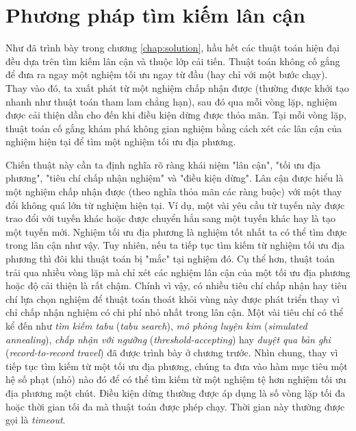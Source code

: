 \chapter{Phương pháp tìm kiếm lân cận}
\label{chap:search}

Như đã trình bày trong chương \ref{chap:solution}, hầu hết các thuật toán hiện đại đều dựa trên tìm kiếm lân cận và thuộc lớp cải tiến. Thuật toán không cố gắng để đưa ra ngay một nghiệm tối ưu ngay từ đầu (hay chỉ với một bước chạy). Thay vào đó, ta xuất phát từ một nghiệm chấp nhận được (thường được khởi tạo nhanh như thuật toán tham lam chẳng hạn), sau đó qua mỗi vòng lặp, nghiệm được cải thiện dần cho đến khi điều kiện dừng được thỏa mãn. Tại mỗi vòng lặp, thuật toán cố gắng khám phá không gian nghiệm bằng cách xét các lân cận của nghiệm hiện tại để tìm một nghiệm tối ưu địa phương. 

Chiến thuật này cần ta định nghĩa rõ ràng khái niệm "lân cận", "tối ưu địa phương", "tiêu chí chấp nhận nghiệm" và "điều kiện dừng". Lân cận được hiểu là một nghiệm chấp nhận được (theo nghĩa thỏa mãn các ràng buộc) với một thay đổi không quá lớn từ nghiệm hiện tại. Ví dụ, một vài yêu cầu từ tuyến này được trao đổi với tuyến khác hoặc được chuyển hẳn sang một tuyến khác hay là tạo một tuyến mới. Nghiệm tối ưu địa phương là nghiệm tốt nhất ta có thể tìm được trong lân cận như vậy. Tuy nhiên, nếu ta tiếp tục tìm kiếm từ nghiệm tối ưu địa phương thì đôi khi thuật toán bị "mắc" tại nghiệm đó. Cụ thể hơn, thuật toán trải qua nhiều vòng lặp mà chỉ xét các nghiệm lân cận của một tối ưu địa phương hoặc độ cải thiện là rất chậm. Chính vì vậy, có nhiều tiêu chí chấp nhận hay tiêu chí lựa chọn nghiệm để thuật toán thoát khỏi vùng này được phát triển thay vì chỉ chấp nhận nghiệm có chi phí nhỏ nhất trong lân cận. Một vài tiêu chí có thể kể đến như \textit{tìm kiếm tabu} (\textit{tabu search}), \textit{mô phỏng luyện kim} (\textit{simulated annealing}), \textit{chấp nhận với ngưỡng} (\textit{threshold-accepting}) hay \textit{duyệt qua bản ghi} (\textit{record-to-record travel}) đã được trình bày ở chương trước. Nhìn chung, thay vì tiếp tục tìm kiếm từ một tối ưu địa phương, chúng ta đưa vào hàm mục tiêu một hệ số phạt (nhỏ) nào đó để có thể tìm kiếm từ một nghiệm tệ hơn nghiệm tối ưu địa phương một chút. Điều kiện dừng thường được áp dụng là số vòng lặp tối đa hoặc thời gian tối đa mà thuật toán được phép chạy. Thời gian này thường được gọi là \textit{timeout}.




